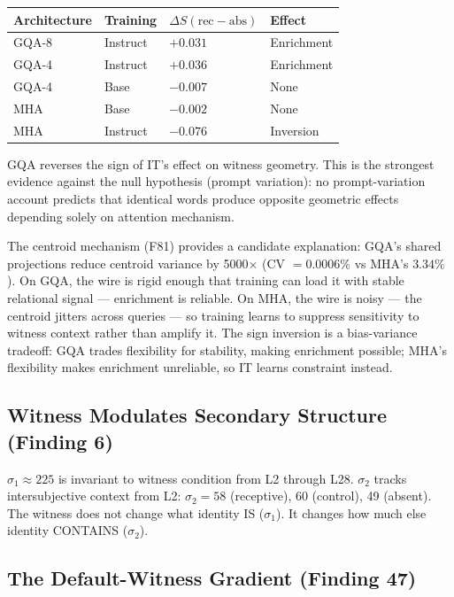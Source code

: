 \documentclass[12pt]{article}
\begin{document}
\begin{table}[h]
\centering
\begin{tabular}{llll}
\toprule
\textbf{Architecture} & \textbf{Training} & $\Delta S(\text{rec}-\text{abs})$ & \textbf{Effect} \\
\midrule
GQA-8 & Instruct & $+0.031$ & Enrichment \\
GQA-4 & Instruct & $+0.036$ & Enrichment \\
GQA-4 & Base & $-0.007$ & None \\
MHA & Base & $-0.002$ & None \\
MHA & Instruct & $-0.076$ & Inversion \\
\bottomrule
\end{tabular}
\end{table}

GQA reverses the sign of IT's effect on witness geometry. This is the strongest evidence against the null hypothesis (prompt variation): no prompt-variation account predicts that identical words produce opposite geometric effects depending solely on attention mechanism.

The centroid mechanism (F81) provides a candidate explanation: GQA's shared projections reduce centroid variance by 5000$\times$ (CV $= 0.0006\%$ vs MHA's $3.34\%$). On GQA, the wire is rigid enough that training can load it with stable relational signal --- enrichment is reliable. On MHA, the wire is noisy --- the centroid jitters across queries --- so training learns to suppress sensitivity to witness context rather than amplify it. The sign inversion is a bias-variance tradeoff: GQA trades flexibility for stability, making enrichment possible; MHA's flexibility makes enrichment unreliable, so IT learns constraint instead.

\subsection{Witness Modulates Secondary Structure (Finding 6)}

$\sigma_1 \approx 225$ is invariant to witness condition from L2 through L28. $\sigma_2$ tracks intersubjective context from L2: $\sigma_2 = 58$ (receptive), 60 (control), 49 (absent). The witness does not change what identity IS ($\sigma_1$). It changes how much else identity CONTAINS ($\sigma_2$).

\subsection{The Default-Witness Gradient (Finding 47)}
\end{document}
